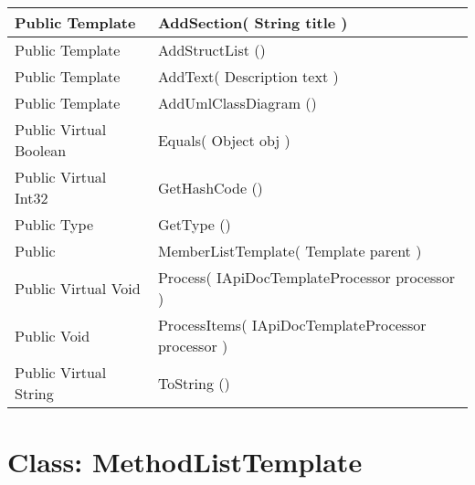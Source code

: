 \documentclass[11pt, oneside, a4paper]{book}
\begin{document}
\begin{center}
\begin{tabular}{| p{3cm} | p{12cm} | }
\hline
 Public  Template &  AddSection(\hypertarget{SoftwareEngineeringTools.{}Documentation.{}MemberListTemplate.{}AddSection\_String}{} String  title  )\\
\hline
 Public  Template &  AddStructList ()\hypertarget{SoftwareEngineeringTools.{}Documentation.{}MemberListTemplate.{}AddStructList}{}\\
\hline
 Public  Template &  AddText(\hypertarget{SoftwareEngineeringTools.{}Documentation.{}MemberListTemplate.{}AddText\_Description}{} Description  text  )\\
\hline
 Public  Template &  AddUmlClassDiagram ()\hypertarget{SoftwareEngineeringTools.{}Documentation.{}MemberListTemplate.{}AddUmlClassDiagram}{}\\
\hline
 Public  Virtual  Boolean &  Equals(\hypertarget{SoftwareEngineeringTools.{}Documentation.{}MemberListTemplate.{}Equals\_Object}{} Object  obj  )\\
\hline
 Public  Virtual  Int32 &  GetHashCode ()\hypertarget{SoftwareEngineeringTools.{}Documentation.{}MemberListTemplate.{}GetHashCode}{}\\
\hline
 Public  Type &  GetType ()\hypertarget{SoftwareEngineeringTools.{}Documentation.{}MemberListTemplate.{}GetType}{}\\
\hline
 Public  &  MemberListTemplate(\hypertarget{SoftwareEngineeringTools.{}Documentation.{}MemberListTemplate.{}MemberListTemplate\_Template}{} Template  parent  )\\
\hline
 Public  Virtual  Void &  Process(\hypertarget{SoftwareEngineeringTools.{}Documentation.{}MemberListTemplate.{}Process\_IApiDocTemplateProcessor}{} IApiDocTemplateProcessor  processor  )\\
\hline
 Public  Void &  ProcessItems(\hypertarget{SoftwareEngineeringTools.{}Documentation.{}MemberListTemplate.{}ProcessItems\_IApiDocTemplateProcessor}{} IApiDocTemplateProcessor  processor  )\\
\hline
 Public  Virtual  String &  ToString ()\hypertarget{SoftwareEngineeringTools.{}Documentation.{}MemberListTemplate.{}ToString}{}\\
\hline
\end{tabular}
\end{center}
 


\hypertarget{SoftwareEngineeringTools.{}Documentation.{}MethodListTemplate}{}
\section{Class: MethodListTemplate}
\end{document}
